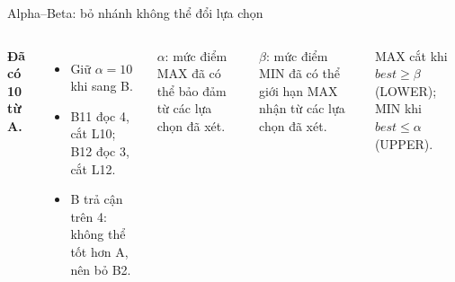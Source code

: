 \documentclass[aspectratio=169,10pt]{beamer}
\begin{document}
\begin{frame}{Alpha--Beta: bỏ nhánh không thể đổi lựa chọn}
\begin{columns}[T,onlytextwidth]
\textbf{Đã có 10 từ A.}\par
\begin{itemize}\setlength{\itemsep}{5pt}
  \item Giữ $\alpha=10$ khi sang B.
  \item B11 đọc 4, cắt L10; B12 đọc 3, cắt L12.
  \item B trả cận trên 4: không thể tốt hơn A, nên bỏ B2.
\end{itemize}
\vspace{4pt}
\small $\alpha$: mức điểm MAX đã có thể bảo đảm từ các lựa chọn đã xét.\par\vspace{3pt}
$\beta$: mức điểm MIN đã có thể giới hạn MAX nhận từ các lựa chọn đã xét.\par\vspace{4pt}
\scriptsize MAX cắt khi $best\ge\beta$ (LOWER); MIN khi $best\le\alpha$ (UPPER).


\end{columns}
\end{frame}
\end{document}
